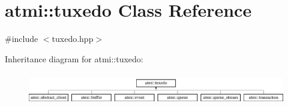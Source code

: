 \hypertarget{classatmi_1_1tuxedo}{}\section{atmi\+:\+:tuxedo Class Reference}
\label{classatmi_1_1tuxedo}


{\ttfamily \#include $<$tuxedo.\+hpp$>$}

Inheritance diagram for atmi\+:\+:tuxedo\+:\begin{figure}[H]
\begin{center}
\leavevmode
\includegraphics[height=1.435897cm]{classatmi_1_1tuxedo}
\end{center}
\end{figure}
